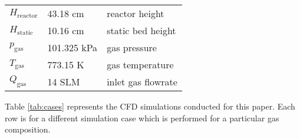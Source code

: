\begin{table}[H]
\begin{tabular}{lll}
        $H_\textrm{reactor}$    & 43.18 cm      & reactor height \\
        $H_\textrm{static}$     & 10.16 cm      & static bed height \\
        $p_\textrm{gas}$        & 101.325 kPa   & gas pressure \\
        $T_\textrm{gas}$        & 773.15 K      & gas temperature \\
        $Q_\textrm{gas}$        & 14 SLM        & inlet gas flowrate \\
        \bottomrule
    \end{tabular}
\end{table}

Table \ref{tab:cases} represents the CFD simulations conducted for this paper. Each row is for a different simulation case which is performed for a particular gas composition.

